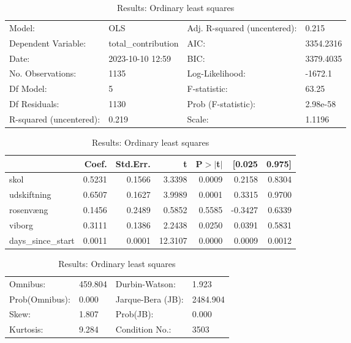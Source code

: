 \begin{table}
\caption{Results: Ordinary least squares}
\label{}
\begin{center}
\begin{tabular}{llll}
\hline
Model:                  & OLS                 & Adj. R-squared (uncentered): & 0.215      \\
Dependent Variable:     & total\_contribution & AIC:                         & 3354.2316  \\
Date:                   & 2023-10-10 12:59    & BIC:                         & 3379.4035  \\
No. Observations:       & 1135                & Log-Likelihood:              & -1672.1    \\
Df Model:               & 5                   & F-statistic:                 & 63.25      \\
Df Residuals:           & 1130                & Prob (F-statistic):          & 2.98e-58   \\
R-squared (uncentered): & 0.219               & Scale:                       & 1.1196     \\
\hline
\end{tabular}
\end{center}

\begin{center}
\begin{tabular}{lrrrrrr}
\hline
                   &  Coef. & Std.Err. &       t & P$> |$t$|$ &  [0.025 & 0.975]  \\
\hline
skol               & 0.5231 &   0.1566 &  3.3398 &      0.0009 &  0.2158 & 0.8304  \\
udskiftning        & 0.6507 &   0.1627 &  3.9989 &      0.0001 &  0.3315 & 0.9700  \\
rosenvæng          & 0.1456 &   0.2489 &  0.5852 &      0.5585 & -0.3427 & 0.6339  \\
viborg             & 0.3111 &   0.1386 &  2.2438 &      0.0250 &  0.0391 & 0.5831  \\
days\_since\_start & 0.0011 &   0.0001 & 12.3107 &      0.0000 &  0.0009 & 0.0012  \\
\hline
\end{tabular}
\end{center}

\begin{center}
\begin{tabular}{llll}
\hline
Omnibus:       & 459.804 & Durbin-Watson:    & 1.923     \\
Prob(Omnibus): & 0.000   & Jarque-Bera (JB): & 2484.904  \\
Skew:          & 1.807   & Prob(JB):         & 0.000     \\
Kurtosis:      & 9.284   & Condition No.:    & 3503      \\
\hline
\end{tabular}
\end{center}
\end{table}
